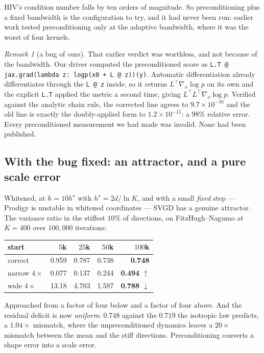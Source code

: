 \documentclass[11pt]{article}
\newcommand{\code}[1]{\texttt{\small #1}}
\theoremstyle{remark}
\newtheorem{remark}{Remark}
\begin{document}
HIV's condition number falls by ten orders of magnitude. So preconditioning plus a fixed bandwidth
is the configuration to try, and it had never been run: earlier work tested preconditioning only at
the adaptive bandwidth, where it was the worst of four kernels.

\begin{remark}[a bug of ours]
That earlier verdict was worthless, and not because of the bandwidth. Our driver computed the
preconditioned score as \code{L.T @ jax.grad(lambda z: logp(x0 + L @ z))(y)}. Automatic
differentiation already differentiates through the \code{L @ z} inside, so it returns
$L^\top\nabla_x\log p$ on its own and the explicit \code{L.T} applied the metric a second time,
giving $L^\top L^\top \nabla_x \log p$. Verified against the analytic chain rule, the corrected line
agrees to $9.7\times10^{-16}$ and the old line is exactly the doubly-applied form to
$1.2\times10^{-15}$: a $98\%$ relative error. Every preconditioned measurement we had made was
invalid. None had been published.
\end{remark}

\subsection{With the bug fixed: an attractor, and a pure scale error}

Whitened, at $h = 10h^\star$ with $h^\star = 2d/\ln K$, and with a small \emph{fixed} step ---
Prodigy is unstable in whitened coordinates --- SVGD has a genuine attractor. The variance ratio in
the stiffest $10\%$ of directions, on FitzHugh--Nagumo at $K = 400$ over $100{,}000$ iterations:

\begin{center}\small
\begin{tabular}{lrrrr}
\toprule
start & $5$k & $25$k & $50$k & $100$k\\
\midrule
correct         & 0.959 & 0.787 & 0.738 & \textbf{0.748}\\
narrow $4\times$ & 0.077 & 0.137 & 0.244 & \textbf{0.494} $\uparrow$\\
wide $4\times$   & 13.18 & 4.703 & 1.587 & \textbf{0.788} $\downarrow$\\
\bottomrule
\end{tabular}
\end{center}

Approached from a factor of four below and a factor of four above. And the residual deficit is now
\emph{uniform}: $0.748$ against the $0.719$ the isotropic law predicts, a $1.04\times$ mismatch,
where the unpreconditioned dynamics leaves a $20\times$ mismatch between the mean and the stiff
directions. Preconditioning converts a shape error into a scale error.
\end{document}
